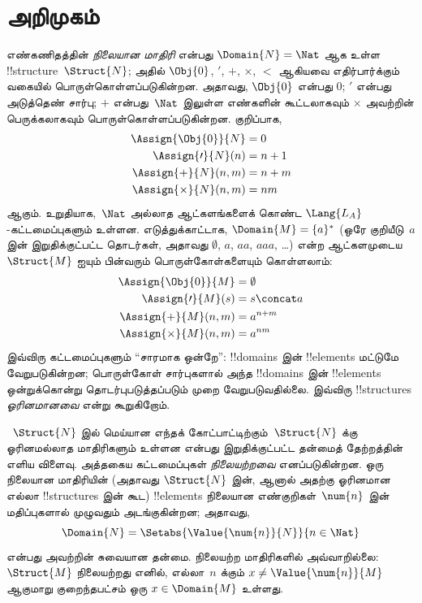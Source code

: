 \documentclass[../../../include/open-logic-section]{subfiles}
\begin{document}

\section{அறிமுகம்}

எண்கணிதத்தின் \emph{நிலையான மாதிரி} என்பது
$\Domain{N} = \Nat$ ஆக உள்ள !!{structure}~$\Struct{N}$; அதில்
$\Obj{0}$, $\prime$, $+$, $\times$, $<$ ஆகியவை எதிர்பார்க்கும்
வகையில் பொருள்கொள்ளப்படுகின்றன. அதாவது, $\Obj{0}$ என்பது $0$;
$\prime$ என்பது அடுத்தெண் சார்பு; $+$ என்பது~$\Nat$ இலுள்ள எண்களின்
கூட்டலாகவும் $\times$ அவற்றின் பெருக்கலாகவும் பொருள்கொள்ளப்படுகின்றன.
குறிப்பாக,
\begin{align*}
  \Assign{\Obj{0}}{N} & = 0\\
  \Assign{\prime}{N}(n) & = n + 1\\
  \Assign{+}{N}(n, m) & = n + m\\
  \Assign{\times}{N}(n, m) & = nm
\end{align*}
ஆகும். உறுதியாக,~$\Nat$ அல்லாத ஆட்களங்களைக் கொண்ட
$\Lang{L_A}$-கட்டமைப்புகளும் உள்ளன. எடுத்துக்காட்டாக,
$\Domain{M} = \{a\}^*$ (ஒரே குறியீடு~$a$ இன் இறுதிக்குட்பட்ட
தொடர்கள், அதாவது $\emptyset$, $a$, $aa$, $aaa$, \dots) என்ற
ஆட்களமுடைய $\Struct{M}$ ஐயும் பின்வரும் பொருள்கோள்களையும் கொள்ளலாம்:
\begin{align*}
  \Assign{\Obj{0}}{M} & = \emptyset\\
  \Assign{\prime}{M}(s) & = s \concat a\\
  \Assign{+}{M}(n, m) & = a^{n + m}\\
  \Assign{\times}{M}(n, m) & = a^{nm}
\end{align*}
இவ்விரு கட்டமைப்புகளும் ``சாரமாக ஒன்றே'': !!{domain}s இன்
!!{element}s மட்டுமே வேறுபடுகின்றன; பொருள்கோள் சார்புகளால் அந்த
!!{domain}s இன் !!{element}s ஒன்றுக்கொன்று தொடர்புபடுத்தப்படும் முறை
வேறுபடுவதில்லை. இவ்விரு !!{structure}s
\emph{ஓரினமானவை} என்று கூறுகிறோம்.

~$\Struct{N}$ இல் மெய்யான எந்தக் கோட்பாட்டிற்கும்~$\Struct{N}$ க்கு
ஓரினமல்லாத மாதிரிகளும் உள்ளன என்பது இறுதிக்குட்பட்ட தன்மைத்
தேற்றத்தின் எளிய விளைவு. அத்தகைய கட்டமைப்புகள் \emph{நிலையற்றவை}
எனப்படுகின்றன. ஒரு நிலையான மாதிரியின் (அதாவது $\Struct{N}$ இன்,
ஆனால் அதற்கு ஓரினமான எல்லா !!{structure}s இன் கூட) !!{element}s
நிலையான எண்குறிகள்~$\num{n}$ இன் மதிப்புகளால் முழுவதும் அடங்குகின்றன;
அதாவது,
\[
\Domain{N} = \Setabs{\Value{\num{n}}{N}}{n \in \Nat}
\]
என்பது அவற்றின் சுவையான தன்மை. நிலையற்ற மாதிரிகளில் அவ்வாறில்லை:
$\Struct{M}$ நிலையற்றது எனில், எல்லா~$n$ க்கும்
$x \neq \Value{\num{n}}{M}$ ஆகுமாறு குறைந்தபட்சம் ஒரு
$x \in \Domain{M}$ உள்ளது.
\end{document}
